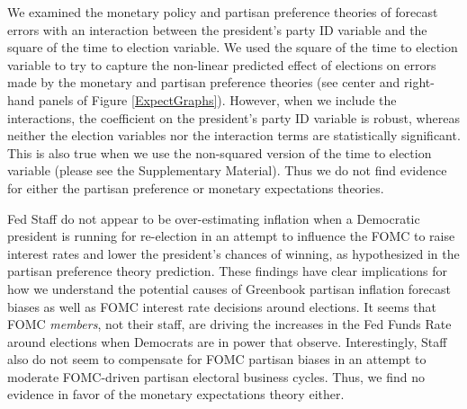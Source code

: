 \documentclass[a4paper]{article}\usepackage[]{graphicx}\usepackage[]{color}
\begin{document}
We examined the monetary policy and partisan preference theories of forecast errors with an interaction between the president's party ID variable and the square of the time to election variable. We used the square of the time to election variable to try to capture the non-linear predicted effect of elections on errors made by the monetary and partisan preference theories (see center and right-hand panels of Figure \ref{ExpectGraphs}). However, when we include the interactions, the coefficient on the president's party ID variable is robust, whereas neither the election variables nor the interaction terms are statistically significant. This is also true when we use the non-squared version of the time to election variable (please see the Supplementary Material). Thus we do not find evidence for either the partisan preference or monetary expectations theories.

Fed Staff do not appear to be over-estimating inflation when a Democratic president is running for re-election in an attempt to influence the FOMC to raise interest rates and lower the president's chances of winning, as hypothesized in the partisan preference theory prediction. These findings have clear implications for how we understand the potential causes of Greenbook partisan inflation forecast biases as well as FOMC interest rate decisions around elections. It seems that FOMC \emph{members}, not their staff, are driving the increases in the Fed Funds Rate around elections when Democrats are in power that \cite{Clark2012} observe. Interestingly, Staff also do not seem to compensate for FOMC partisan biases in an attempt to moderate FOMC-driven partisan electoral business cycles. Thus, we find no evidence in favor of the monetary expectations theory either.
\end{document}
